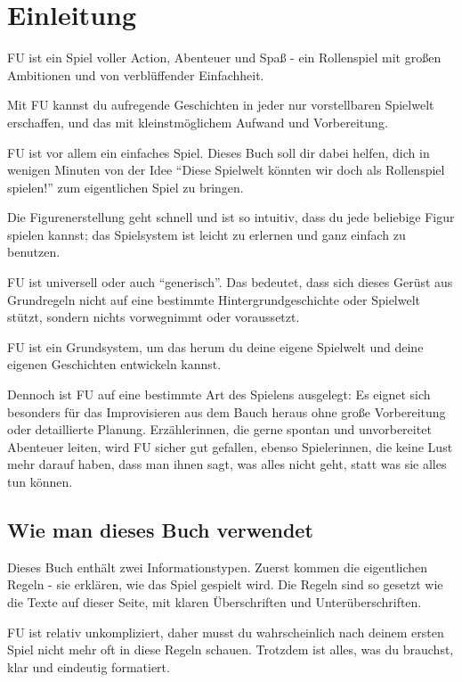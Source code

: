 \documentclass[]{article}
\date{}
\begin{document}
\section{Einleitung}\label{einleitung}

FU ist ein Spiel voller Action, Abenteuer und Spaß - ein Rollenspiel mit
großen Ambitionen und von verblüffender Einfachheit.

Mit FU kannst du aufregende Geschichten in jeder nur vorstellbaren
Spielwelt erschaffen, und das mit kleinstmöglichem Aufwand und
Vorbereitung.

FU ist vor allem ein einfaches Spiel. Dieses Buch soll dir dabei helfen,
dich in wenigen Minuten von der Idee ``Diese Spielwelt könnten wir doch
als Rollenspiel spielen!'' zum eigentlichen Spiel zu bringen.

Die Figurenerstellung geht schnell und ist so intuitiv, dass du jede
beliebige Figur spielen kannst; das Spielsystem ist leicht zu erlernen
und ganz einfach zu benutzen.

FU ist universell oder auch ``generisch''. Das bedeutet, dass sich
dieses Gerüst aus Grundregeln nicht auf eine bestimmte
Hintergrundgeschichte oder Spielwelt stützt, sondern nichts vorwegnimmt
oder voraussetzt.

FU ist ein Grundsystem, um das herum du deine eigene Spielwelt und deine
eigenen Geschichten entwickeln kannst.

Dennoch ist FU auf eine bestimmte Art des Spielens ausgelegt: Es eignet
sich besonders für das Improvisieren aus dem Bauch heraus ohne große
Vorbereitung oder detaillierte Planung. Erzählerinnen, die gerne spontan
und unvorbereitet Abenteuer leiten, wird FU sicher gut gefallen, ebenso
Spielerinnen, die keine Lust mehr darauf haben, dass man ihnen sagt, was
alles nicht geht, statt was sie alles tun können.

\subsection{Wie man dieses Buch verwendet}\label{wie-man-dieses-buch-verwendet}

Dieses Buch enthält zwei Informationstypen. Zuerst kommen die
eigentlichen Regeln - sie erklären, wie das Spiel gespielt wird. Die
Regeln sind so gesetzt wie die Texte auf dieser Seite, mit klaren
Überschriften und Unterüberschriften.

FU ist relativ unkompliziert, daher musst du wahrscheinlich nach deinem
ersten Spiel nicht mehr oft in diese Regeln schauen. Trotzdem ist alles,
was du brauchst, klar und eindeutig formatiert.
\end{document}
